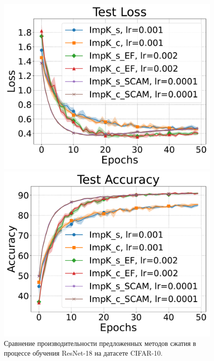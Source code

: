 \begin{figure}[ht]
\begin{minipage}{0.45\textwidth}
            \end{minipage}
            \begin{minipage}{0.45\textwidth}
                \includegraphics[width=\textwidth]{figures/resnet/experiment1/Test Loss.pdf}
            \end{minipage}
            \begin{minipage}{0.45\textwidth}
                \includegraphics[width=\textwidth]{figures/resnet/experiment1/Test Accuracy.pdf}
            \end{minipage}
            \caption{Сравнение производительности предложенных методов сжатия в процессе обучения ResNet-18 на датасете CIFAR-10.}
    \end{figure}

